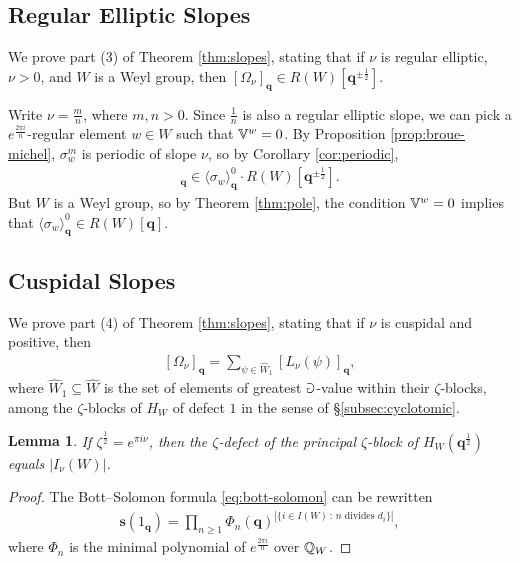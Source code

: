 \documentclass[a4paper,10pt,leqno]{amsart}
\theoremstyle{plain}
\theoremstyle{plain}
\theoremstyle{plain}
\newtheorem{lem}[thm]{Lemma}
\theoremstyle{definition}
\theoremstyle{remark}
\newcommand{\Q}{\bm{q}}
\newcommand{\Tr}[1]{\langle{#1}\rangle_{\Q}}
\newcommand{\slope}{\nu}
\begin{document}
\subsection{Regular Elliptic Slopes}

We prove part (3) of Theorem \ref{thm:slopes}, stating that if $\slope$ is regular elliptic, $\slope > 0$, and $W$ is a Weyl group, then $[\Omega_\slope]_{\Q} \in R(W)[\Q^{\pm\frac{1}{2}}]$.

Write $\slope = \frac{m}{n}$, where $m, n > 0$.
Since $\frac{1}{n}$ is also a regular elliptic slope, we can pick a $e^{\frac{2\pi i}{n}}$-regular element $w \in W$ such that $\mathbb{V}^w = 0$.
By Proposition \ref{prop:broue-michel}, $\sigma_w^m$ is periodic of slope $\slope$, so by Corollary \ref{cor:periodic}, 
\begin{align}
[\Omega_\slope]_{\Q}
\in \Tr{\sigma_w}^0 \cdot R(W)[\Q^{\pm\frac{1}{2}}].
\end{align}
But $W$ is a Weyl group, so by Theorem \ref{thm:pole}, the condition $\mathbb{V}^w = 0$ implies that $\Tr{\sigma_w}^0 \in R(W)[\Q]$.

\subsection{Cuspidal Slopes}

We prove part (4) of Theorem \ref{thm:slopes}, stating that if $\slope$ is cuspidal and positive, then
\begin{align}
{[\Omega_\slope]_{\Q}}
=	\sum_{\psi \in \hat{W}_1}
	{[L_\slope(\psi)]_{\Q}},
\end{align}
where $\hat{W}_1 \subseteq \hat{W}$ is the set of elements of greatest $\mathbb{a}$-value within their $\zeta$-blocks, among the $\zeta$-blocks of $H_W$ of defect $1$ in the sense of \S\ref{subsec:cyclotomic}.

\begin{lem}\label{lem:defect-invariants-principal}
If $\zeta^{\frac{1}{2}} = e^{\pi i\slope}$, then the $\zeta$-defect of the principal $\zeta$-block of $H_W(\Q^{\frac{1}{2}})$ equals $|I_\slope(W)|$.
\end{lem}

\begin{proof}
The Bott--Solomon formula \eqref{eq:bott-solomon} can be rewritten
\begin{align}
\bm{s}(1_{\Q}) = \prod_{n \geq 1}
\Phi_n(\Q)^{|\{i \in I(W)\,:\,\text{$n$ divides $d_i$}\}|},
\end{align}
where $\Phi_n$ is the minimal polynomial of $e^{\frac{2\pi i}{n}}$ over $\mathbb{Q}_W$.
\end{proof}
\end{document}
